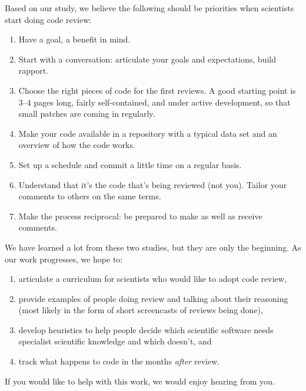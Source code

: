 \documentclass[10pt,twocolumn]{article}
\begin{document}
Based on our study,
we believe the following should be priorities when scientists start doing code review:

\begin{enumerate}

\item Have a goal, a benefit in mind.

\item Start with a conversation:
articulate your goals and expectations, build rapport.

\item Choose the right pieces of code for the first reviews.
A good starting point is 3--4 pages long,
fairly self-contained,
and under active development,
so that small patches are coming in regularly.

\item Make your code available in a repository
with a typical data set
and an overview of how the code works.

\item Set up a schedule and commit a little time on a regular basis.

\item Understand that it's the code that's being reviewed (not you).
Tailor your comments to others on the same terms.

\item Make the process reciprocal:
be prepared to make as well as receive comments.

\end{enumerate}

We have learned a lot from these two studies,
but they are only the beginning.
As our work progresses,
we hope to:

\begin{enumerate}

\item
articulate a curriculum for scientists who would like to adopt code review,

\item
provide examples of people doing review and talking about their reasoning
(most likely in the form of short screencasts of reviews being done),

\item
develop heuristics to help people decide
which scientific software needs specialist scientific knowledge
and which doesn't,
and

\item
track what happens to code in the months \emph{after} review.

\end{enumerate}

If you would like to help with this work,
we would enjoy hearing from you.

{\small


}
\end{document}
